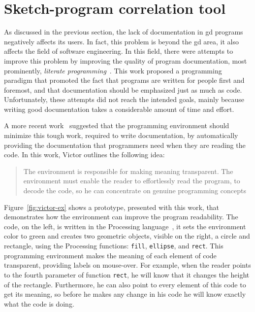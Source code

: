 \section{Sketch-program correlation tool}
\label{section:sc-tool}

As discussed in the previous section, the lack of documentation in \gls{gd} programs negatively affects its users. In fact, this problem is beyond the \gls{gd} area, it also affects the field of software engineering. In this field, there were attempts to improve this problem by improving the quality of program documentation, most prominently, \textit{literate programming}~\citep{knuth1984literate}. This work proposed a programming paradigm that promoted the fact that programs are written for people first and foremost, and that documentation should be emphasized just as much as code. Unfortunately, these attempts did not reach the intended goals, mainly because writing good documentation takes a considerable amount of time and effort.

A more recent work~\citep{learnableProg} suggested that the programming environment should minimize this tough work, required to write documentation, by automatically providing the documentation that programmers need when they are reading the code. In this work, Victor outlines the following idea:

\blockquote{The environment is responsible for making meaning transparent. The environment must enable the reader to effortlessly read the program, to decode the code, so he can concentrate on genuine programming concepts~\citep{learnableProg}}

Figure~\ref{fig:victor-ex} shows a prototype, presented with this work, that demonstrates how the environment can improve the program readability. The code, on the left, is written in the Processing language~\citep{Reas2006}, it sets the environment color to green and creates two geometric objects, visible on the right, a circle and rectangle, using the Processing functions: \texttt{fill}, \texttt{ellipse}, and \texttt{rect}. This programming environment makes the meaning of each element of code transparent, providing labels on mouse-over. For example, when the reader points to the fourth parameter of function \texttt{rect}, he will know that it changes the height of the rectangle. Furthermore, he can also point to every element of this code to get its meaning, so before he makes any change in his code he will know exactly what the code is doing.     

